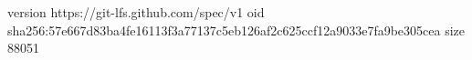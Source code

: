 version https://git-lfs.github.com/spec/v1
oid sha256:57e667d83ba4fe16113f3a77137c5eb126af2c625ccf12a9033e7fa9be305cea
size 88051
